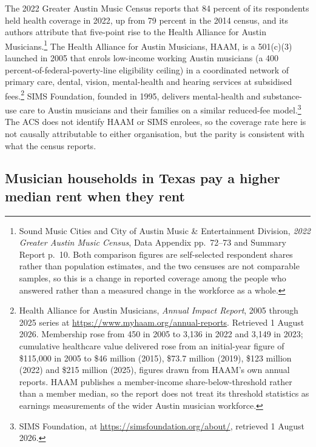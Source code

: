 The 2022 Greater Austin Music Census reports that 84 percent of its
respondents held health coverage in 2022, up from 79 percent in the 2014
census, and its authors attribute that five-point rise to the Health
Alliance for Austin Musicians.\footnote{Sound Music Cities and City of
Austin Music \& Entertainment Division, \emph{2022 Greater Austin Music
Census}, Data Appendix pp.\ 72--73 and Summary Report p.\ 10. Both
comparison figures are self-selected respondent shares rather than
population estimates, and the two censuses are not comparable samples, so
this is a change in reported coverage among the people who answered rather
than a measured change in the workforce as a whole.} The Health Alliance
for Austin Musicians, HAAM, is a 501(c)(3) launched in 2005 that enrols
low-income working Austin musicians (a 400 percent-of-federal-poverty-line
eligibility ceiling) in a coordinated network of primary care, dental,
vision, mental-health and hearing services at subsidised
fees.\footnote{Health Alliance for Austin Musicians, \emph{Annual Impact
Report}, 2005 through 2025 series at
\url{https://www.myhaam.org/annual-reports}. Retrieved 1 August 2026.
Membership rose from 450 in 2005 to 3{,}136 in 2022 and 3{,}149 in 2023;
cumulative healthcare value delivered rose from an initial-year figure of
\$115{,}000 in 2005 to \$46 million (2015), \$73.7 million (2019), \$123
million (2022) and \$215 million (2025), figures drawn from HAAM's own
annual reports. HAAM publishes a member-income share-below-threshold rather
than a member median, so the report does not treat its threshold statistics
as earnings measurements of the wider Austin musician workforce.} SIMS
Foundation, founded in 1995, delivers mental-health and substance-use care
to Austin musicians and their families on a similar
reduced-fee model.\footnote{SIMS Foundation, at
\url{https://simsfoundation.org/about/}, retrieved 1 August 2026.} The ACS
does not identify HAAM or SIMS enrolees, so the coverage rate here is not
causally attributable to either organisation, but the parity is consistent
with what the census reports.

\subsection{Musician households in Texas pay a higher median rent when they rent}

